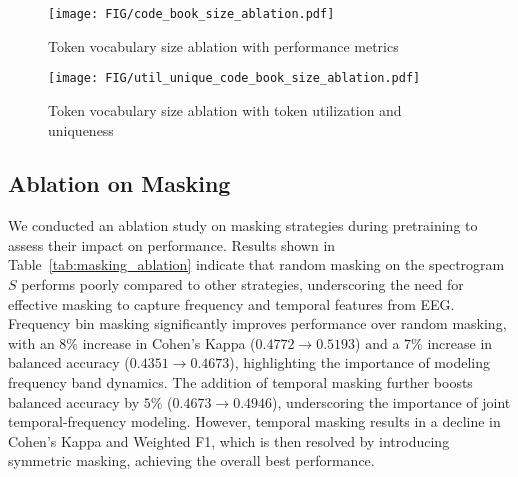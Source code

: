 \begin{figure}[thpb]
    \centering
    \texttt{[image: FIG/code\_book\_size\_ablation.pdf]}
    \caption{Token vocabulary size ablation with performance metrics}
    \label{fig:codebook_ablation_metrics}
    \vspace{-0.4cm}
\end{figure}

\begin{figure}[thpb]
    \centering
    \texttt{[image: FIG/util\_unique\_code\_book\_size\_ablation.pdf]}
    \caption{Token vocabulary size ablation with token utilization and uniqueness}
    \label{fig:codebook_ablation_util_unique}
    \vspace{-0.4cm}
\end{figure}


\newpage
\subsection{Ablation on Masking}

We conducted an ablation study on masking strategies during \tokenizer pretraining to assess their impact on performance. Results shown in Table~\ref{tab:masking_ablation} indicate that random masking on the spectrogram $S$ performs poorly compared to other strategies, underscoring the need for effective masking to capture frequency and temporal features from EEG. Frequency bin masking significantly improves performance over random masking, with an $8\%$ increase in Cohen's Kappa ($0.4772 \rightarrow 0.5193$) and a $7\%$ increase in balanced accuracy ($0.4351 \rightarrow 0.4673$), highlighting the importance of modeling frequency band dynamics. The addition of temporal masking further boosts balanced accuracy by $5\%$ ($0.4673 \rightarrow 0.4946$), underscoring the importance of joint temporal-frequency modeling. However, temporal masking results in a decline in Cohen's Kappa and Weighted F1, which is then resolved by introducing symmetric masking, achieving the overall best performance.




